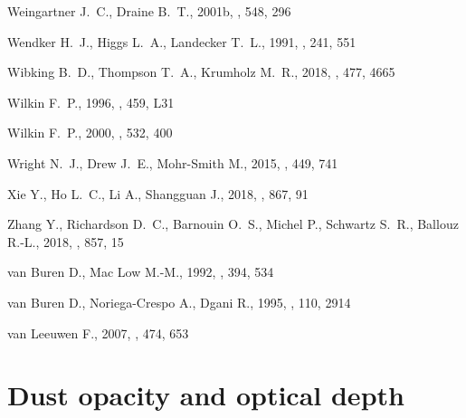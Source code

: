 \documentclass[useAMS, usenatbib, a4paper]{mnras}
\begin{document}
\begin{thebibliography}{}
{Weingartner} J.~C.,  {Draine} B.~T.,  2001b, \apj, 548, 296

{Wendker} H.~J.,  {Higgs} L.~A.,   {Landecker} T.~L.,  1991, \aap, 241, 551

{Wibking} B.~D.,  {Thompson} T.~A.,   {Krumholz} M.~R.,  2018, \mnras, 477,
  4665

{Wilkin} F.~P.,  1996, \apjl, 459, L31

{Wilkin} F.~P.,  2000, \apj, 532, 400

{Wright} N.~J.,  {Drew} J.~E.,   {Mohr-Smith} M.,  2015, \mnras, 449, 741

{Xie} Y.,  {Ho} L.~C.,  {Li} A.,   {Shangguan} J.,  2018, \apj, 867, 91

{Zhang} Y.,  {Richardson} D.~C.,  {Barnouin} O.~S.,  {Michel} P.,  {Schwartz}
  S.~R.,   {Ballouz} R.-L.,  2018, \apj, 857, 15

{van Buren} D.,  {Mac Low} M.-M.,  1992, \apj, 394, 534

{van Buren} D.,  {Noriega-Crespo} A.,   {Dgani} R.,  1995, \aj, 110, 2914

{van Leeuwen} F.,  2007, \aap, 474, 653

\makeatother
\end{thebibliography}
 
\appendix

\section{Dust opacity and optical depth}
\label{app:dust-opacity}
\end{document}
